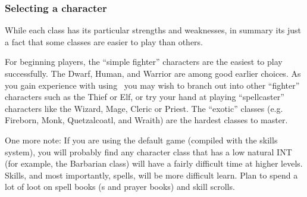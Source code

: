 \subsubsection{Selecting a character}

While each class has its particular strengths and weaknesses, in summary
its just a fact that some classes are easier to play than others.

For beginning players, the ``simple fighter'' characters are the easiest to
play successfully. The Dwarf, Human, and Warrior are among good earlier
choices. As you gain experience
with using \cf\ you may wish to branch out into other ``fighter'' characters
such as the Thief or Elf, or try your hand at playing ``spellcaster''
characters like the Wizard, Mage, Cleric or Priest.
The ``exotic'' classes (e.g. Fireborn, Monk, Quetzalcoatl, and Wraith) are
the hardest classes to master.

One more note: If you are using the default game (compiled with the skills
system),
you will probably find any character class that has a low natural INT (for
example, the Barbarian class) will have a fairly difficult time at higher
levels. Skills, and most importantly, spells, will be more difficult
learn. Plan to spend a lot of loot on spell books (\wizbook s and prayer books)
and skill scrolls.
